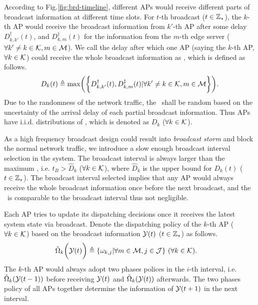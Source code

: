 According to Fig.\ref{fig:brd-timeline}, different APs would receive different parts of broadcast information at different time slots.
For $t$-th broadcast ($t\in\mathbb{Z}_{*}$), the $k$-th AP would receive the broadcast information from $k'$-th AP after some delay $D^{\dagger}_{k,k'}({t})$, and $D^{\ddagger}_{k,m}({t})$ for the information from the $m$-th edge server ($\forall k' \neq k \in\mathcal{K}, m\in\mathcal{M}$).
We call the delay after which one AP (saying the $k$-th AP, $\forall k\in\mathcal{K}$) could receive the whole broadcast information as \brdelay, which is defined as follows.
\begin{align}
    D_{k}({t}) \define \max\Paren{\Brace{
        D^{\dagger}_{k,k'}({t}),
        D^{\ddagger}_{k,m}({t}) | \forall k' \neq k \in \apSet, m\in\esSet
    }}.
\end{align}
Due to the randomness of the network traffic, the \brdelay~shall be random based on the uncertainty of the arrival delay of each partial broadcast information.
Thus APs have i.i.d. distributions of \brdelay, which is denoted as $D_{k}$ ($\forall k \in \mathcal{K}$).

As a high frequency broadcast design could result into \emph{broadcast storm} and block the normal network traffic, we introduce a slow enough broadcast interval selection in the system.
The broadcast interval is always larger than the maximum \brdelay, i.e. $t_B > \hat{D}_k$ ($\forall k\in\mathcal{K}$), where $\hat{D}_k$ is the upper bound for $D_{k}({t})$ ($t\in\mathbb{Z}_{*}$).
The broadcast interval selected implies that any AP would always receive the whole broadcast information once before the next broadcast, and the \brdelay~is comparable to the broadcast interval thus not negligible.

Each AP tries to update its dispatching decisions once it receives the latest system state via broadcast.
Denote the dispatching policy of the $k$-th AP ($\forall k\in\mathcal{K}$) based on the broadcast information $\mathcal{Y}({t})$ ($t \in\mathbb{Z}_{*}$) as follows.
\begin{align}
    &\tilde{\Omega}_{k}\bigg(\mathcal{Y}({t})\bigg) \triangleq \{\omega_{k,j}|\forall m\in\mathcal{M}, j\in\mathcal{J}\}
    ~(\forall k\in\mathcal{K}).
    \label{def_action}
\end{align}
The $k$-th AP would always adopt two phases polices in the $i$-th interval, i.e. $\tilde{\Omega}_{k}(\mathcal{Y}({t-1}))$ before receiving $\mathcal{Y}({t})$ and $\tilde{\Omega}_{k}(\mathcal{Y}({t}))$ afterwards.
The two phases policy of all APs together determine the information of $\mathcal{Y}({t+1})$ in the next interval.

